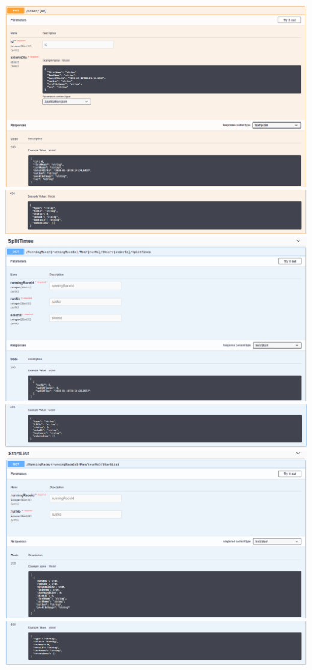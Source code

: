 \documentclass[a4paper, 12pt]{article}
\begin{document}
	\newline	
	\includegraphics[width=.7\textwidth]{img/Controller_skier_put_1.png}
	\newline	
	\includegraphics[width=.7\textwidth]{img/Controller_skier_put_2.png}
	\newline	
	\includegraphics[width=.7\textwidth]{img/Controller_splitTimes_get_1.png}
	\newline
	\includegraphics[width=.7\textwidth]{img/Controller_splitTimes_get_2.png}
	\newline
	\includegraphics[width=.7\textwidth]{img/Controller_startList_get_1.png}
	\newline
	\includegraphics[width=.7\textwidth]{img/Controller_startList_get_2.png}
	\newline
\end{document}
